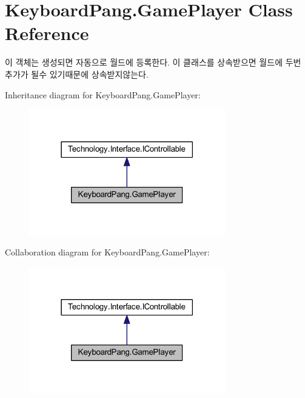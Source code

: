 \hypertarget{class_keyboard_pang_1_1_game_player}{\section{Keyboard\-Pang.\-Game\-Player Class Reference}
\label{class_keyboard_pang_1_1_game_player}
}


이 객체는 생성되면 자동으로 월드에 등록한다. 이 클래스를 상속받으면 월드에 두번 추가가 될수 있기때문에 상속받지않는다.  




Inheritance diagram for Keyboard\-Pang.\-Game\-Player\-:
\nopagebreak
\begin{figure}[H]
\begin{center}
\leavevmode
\includegraphics[width=242pt]{class_keyboard_pang_1_1_game_player__inherit__graph}
\end{center}
\end{figure}


Collaboration diagram for Keyboard\-Pang.\-Game\-Player\-:
\nopagebreak
\begin{figure}[H]
\begin{center}
\leavevmode
\includegraphics[width=242pt]{class_keyboard_pang_1_1_game_player__coll__graph}
\end{center}
\end{figure}
